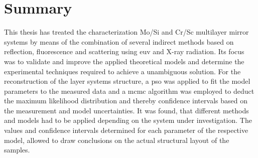 \chapter{Summary} \label{ch_summary}


This thesis has treated the characterization Mo/Si and Cr/Sc multilayer mirror systems by means of the combination of several indirect methods based on reflection, fluorescence and scattering using \gls{euv} and X-ray radiation. Its focus was to validate and improve the applied theoretical models and determine the experimental techniques required to achieve a unambiguous solution. For the reconstruction of the layer systems structure, a \glsdesc{pso} was applied to fit the model parameters to the measured data and a \glsdesc{mcmc} algorithm was employed to deduct the maximum likelihood distribution and thereby confidence intervals based on the measurement and model uncertainties. It was found, that different methods and models had to be applied depending on the system under investigation. The values and confidence intervals determined for each parameter of the respective model, allowed to draw conclusions on the actual structural layout of the samples.


